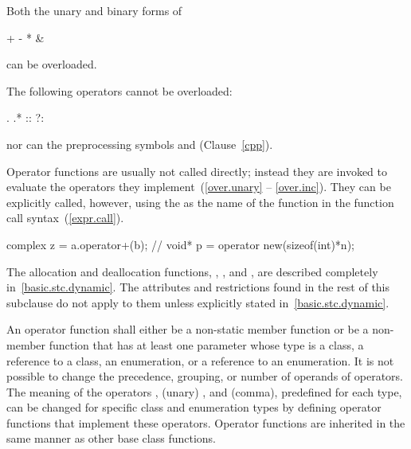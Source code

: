 \pnum
Both the unary and binary forms of

\begin{codeblock}
+    -    *     &
\end{codeblock}

can be overloaded.

\pnum
{}%
The following operators cannot be overloaded:

\begin{codeblock}
.    .*   ::    ?:
\end{codeblock}

nor can the preprocessing symbols
\tcode{\#}
and
\tcode{\#\#}
(Clause~\ref{cpp}).

\pnum
{}%
Operator functions are usually not called directly; instead they are invoked
to evaluate the operators they implement~(\ref{over.unary} -- \ref{over.inc}).
They can be explicitly called, however, using the
as the name of the function in the function call syntax~(\ref{expr.call}).
\begin{example}

\begin{codeblock}
complex z = a.operator+(b);     // 
void* p = operator new(sizeof(int)*n);
\end{codeblock}
\end{example}

\pnum
The allocation and deallocation functions,
,
,
and
,
are described completely in~\ref{basic.stc.dynamic}.
The attributes and restrictions
found in the rest of this subclause do not apply to them unless explicitly
stated in~\ref{basic.stc.dynamic}.

\pnum
{}%
An operator function
shall either be a non-static member function or be a non-member function that
has at least one parameter whose type is a class, a reference to a class, an
enumeration, or a reference to an enumeration.
It is not possible to change the precedence, grouping, or number of operands
of operators.
The meaning of the operators
\tcode{=},
(unary)
\tcode{\&},
and
\tcode{,}
(comma), predefined for each type, can be changed for specific
class and enumeration types by
defining operator functions that implement these operators.
%
Operator functions are inherited in the same manner as other base class
functions.

